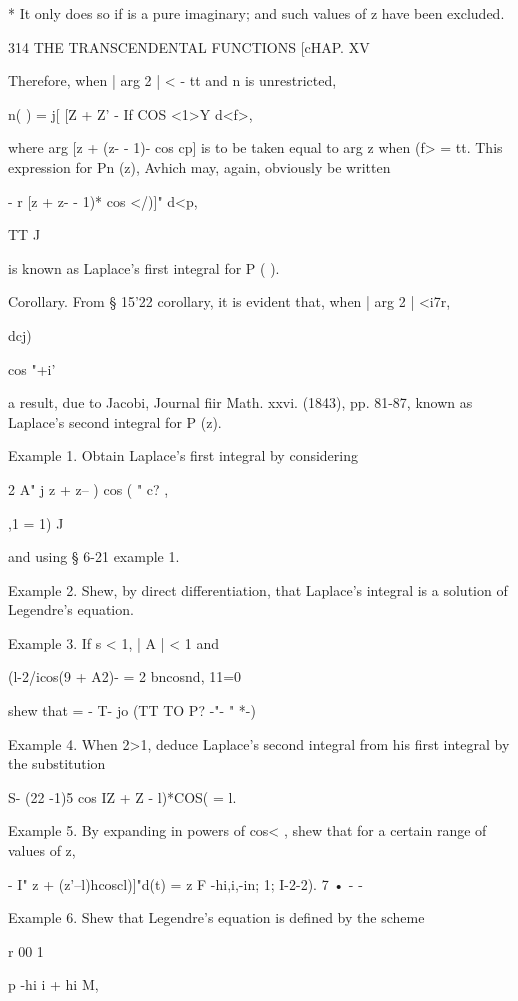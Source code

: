 {{* It only does so if is a pure imaginary; and such values of z have
been excluded.



314 THE TRANSCENDENTAL FUNCTIONS [cHAP. XV

Therefore, when | arg 2 | < - tt and n is unrestricted,

 n( ) = j[ [Z + Z' - If COS <1>Y d<f>,

where arg [z + (z- - 1)- cos cp] is to be taken equal to arg z when
(f> = tt. This expression for Pn (z), Avhich may, again, obviously be
written

- r [z + z- - 1)* cos </)]" d<p,

TT J

is known as Laplace's first integral for P ( ).

Corollary. From § 15'22 corollary, it is evident that, when | arg 2 |
<i7r,

dcj)






 cos "+i'

a result, due to Jacobi, Journal fiir Math. xxvi. (1843), pp. 81-87,
known as Laplace's second integral for P (z).

Example 1. Obtain Laplace's first integral by considering

2 A" j z + z-- ) cos ( " c? ,

,1 = 1) J

and using § 6-21 example 1.

Example 2. Shew, by direct differentiation, that Laplace's integral is
a solution of Legendre's equation.

Example 3. If s < 1, | A | < 1 and

(l-2/icos(9 + A2)- = 2 bncosnd, 11=0

shew that = - T- jo (TT TO P? -"- " *-)

Example 4. When 2>1, deduce Laplace's second integral from his first
integral by the substitution

 S- (22 -1)5 cos IZ + Z - l)*COS( = l.

Example 5. By expanding in powers of cos< , shew that for a certain
range of values of z,

- I" z + (z'--l)hcoscl)]"d(t) = z F -hi,i,-in; 1; I-2-2). 7 • - -

Example 6. Shew that Legendre's equation is defined by the scheme

r 00 1

p -hi i + hi M,

}}
